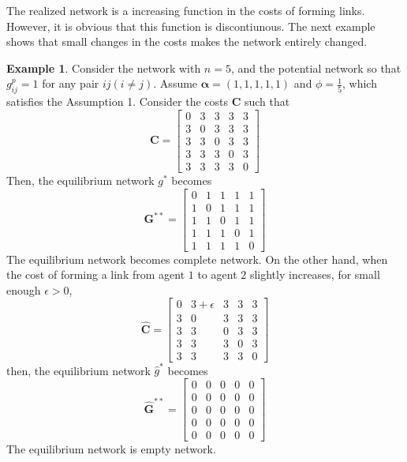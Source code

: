 \documentclass[12pt]{article}
\theoremstyle{definition}
\newtheorem{example}{Example}
\newcommand{\bm}[1]{\boldsymbol{#1}}
\begin{document}
The realized network is a increasing function in the costs of forming links.
However, it is obvious that this function is discontiunous.
The next example shows that small changes in the costs makes the network entirely changed.

\begin{example}
Consider the network with $n = 5$, and the potential network so that $g_{ij}^p = 1$ for any pair $ij(i \neq j)$.
Assume $\bm{\alpha} = (1, 1, 1, 1, 1)$ and $\phi = \frac{1}{5}$, which satisfies the Assumption 1.
Consider the costs $\bm{C}$ such that
\[ \bm{C} = \left[
			\begin{array}{ccccc}
				0 & 3 & 3 & 3 & 3 \\
				3 & 0 & 3 & 3 & 3 \\
				3 & 3 & 0 & 3 & 3 \\
				3 & 3 & 3 & 0 & 3  \\
				3 & 3 & 3 & 3 & 0
			\end{array} \right] \]
Then, the equilibrium network $g^*$ becomes
\[\bm{G}^{**} = \left[
			\begin{array}{ccccc}
				0 & 1 & 1 & 1 & 1 \\
				1 & 0 & 1 & 1 & 1 \\
				1 & 1 & 0 & 1 & 1 \\
				1 & 1 & 1 & 0 & 1 \\
				1 & 1 & 1 & 1 & 0
			\end{array} \right] \]
The equilibrium network becomes complete network.
On the other hand, when the cost of forming a link from agent $1$ to agent $2$ slightly increases, for small enough $\epsilon > 0$,
\[ \bm{\hat{C}} = \left[
			\begin{array}{ccccc}
				0 & 3 + \epsilon & 3 & 3 & 3 \\
				3 & 0 & 3 & 3 & 3 \\
				3 & 3 & 0 & 3 & 3 \\
				3 & 3 & 3 & 0 & 3  \\
				3 & 3 & 3 & 3 & 0
			\end{array} \right] \]
then, the equilibrium network $\hat{g}^*$ becomes
\[ \bm{\hat{G}}^{**} = \left[
			\begin{array}{ccccc}
				0 & 0 & 0 & 0 & 0 \\
				0 & 0 & 0 & 0 & 0 \\
				0 & 0 & 0 & 0 & 0 \\
				0 & 0 & 0 & 0 & 0 \\
				0 & 0 & 0 & 0 & 0
			\end{array} \right] \]
The equilibrium network is empty network.
\end{example}
\end{document}
